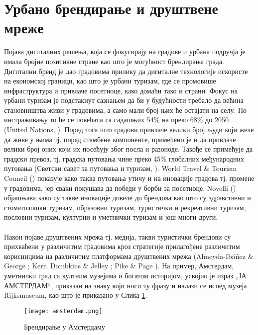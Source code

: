 \documentclass{article}
\begin{document}
\section{Урбано брендирање и друштвене мреже}
Појава дигиталних решења, која се фокусирају на градове и урбана подручја је имала бројне позитивне стране као што је могућност брендирања града. Дигитални бренд је дао градовима прилику да дигиталне технологије искористе на економској граници, као што је урбани туризам, где се промовише инфраструктура и привлаче посетиоце, како домаћи тако и страни. Фокус на урбани туризам је подстакнут сазнањем да би у будућности требало да већина становништва живи у градовима, а само мали број њих ће остајати на селу. По инстраживању то ће се повећати са садашњих 54\% на преко 68\% до 2050. (United Nations, \cite{un_2017}). Поред тога што градови привлаче велики број људи који желе да живе у њима тј. поред стамбене компоненте, примећено је и да привлаче велики број оних који их посећују због посла и разоноде. Такође се примећује да градски превоз, тј. градска путовања чине преко 45\% глобалних међународних путовања (Светски савет за путовања и туризам, \cite{wt_2018}). World Travel \& Tourism Council (\cite{wt_2018}) показује како таква путовања утичу и на иновације градова тј. промене у градовима, јер сваки покушава да победи у борби за посетиоце. Novelli (\cite{no_2005}) објашњава како су такве иновације довеле до брендова као што су здравствени и стоматолошки туризам, образовни туризам, туристички и рекреативни туризам, пословни туризам, културни и уметнички туризам и још многи други.
\\\\
Након појаве друштвених мрежа тј. медија, такви туристички брендови су прихваћени у различитим градовима кроз стратегије прилагођене различитим корисницима на различитим платформама друштвених мрежа (Almeyda-Ibáñez \& George \cite{ag_2017}; Kerr, Dombkins \& Jelley \cite{kdj_2012}; Pike \& Page \cite{pp_2014}).
На пример, Амстердам, уметнички град са култним музејима и богатом историјом, усвојио је израз „ЈА АМСТЕРДАМ“, приказан на  знаку који носи ту фразу и налази се испед музеја Rijksmuseum, као што је приказано у Слика \ref{fig:amsterdam}. 

\begin{figure}[h!]
\centering
\texttt{[image: amsterdam.png]}
\caption{\label{fig:amsterdam}Брендирање у Амстердаму}
\end{figure}
\end{document}
